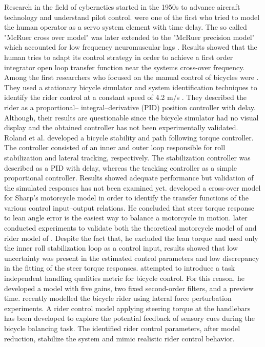 Research in the field of cybernetics started in the 1950s to advance aircraft technology and understand pilot control. \citet{mcruer1959human} were one of the first who tried to model the human operator as a servo system element with  time delay. The so called "McRuer cross over model" was later extended to the "McRuer precision model" which accounted for low frequency neuromuscular lags \cite{mcruer1967manual}.  Results showed that the human tries to adapt its control strategy in order to achieve a first order integrator open loop transfer function  near the systems cross-over frequency. Among the first researchers who focused on the manual control of bicycles were \citet{van1970influence}. They used a stationary bicycle simulator and system identification techniques to identify the rider control at a constant speed of 4.2 m/s . They described the rider as a proportional– integral–derivative (PID) position controller with delay. Although, their results are questionable since the bicycle simulator had no visual display and the obtained controller has not been experimentally validated. Roland et al. \cite{roland1971massing, roland1973computer} developed a bicycle stability and path following torque controller. The controller consisted of an inner and outer loop responsible for roll stabilization and lateral tracking, respectively. The stabilization controller was described as a PID with delay, whereas the tracking controller as a simple proportional controller. Results showed adequate performance but validation of the simulated responses has not been examined yet. \citet{weir1973manual} developed a cross-over model for Sharp's  \cite{sharp1971stability} motorcycle model in order to identify the transfer functions of the various control input–output relations. He concluded that steer torque response to lean angle error is the easiest way to balance a motorcycle in motion. \citet{eaton1975man} later conducted experiments to validate both the theoretical motorcycle model of  \citet{sharp1971stability} and rider model of \citet{weir1973manual} . Despite the fact that, he excluded the lean torque and used only the inner roll stabilization loop as a control input, results showed that low uncertainty was present in the estimated control parameters and low discrepancy in the fitting of the steer torque responses. \citet{hess2012modeling} attempted to introduce a task independent handling qualities metric for bicycle control. For this reason, he developed a model with five gains, two fixed second-order filters, and a preview time. \citet{schwab2013} recently  modelled the bicycle rider using lateral force perturbation experiments. A rider control model applying steering torque at the handlebars has been developed to explore the potential feedback of sensory cues during the bicycle balancing task. The identified rider control parameters, after model reduction, stabilize the system and mimic realistic rider control behavior.

